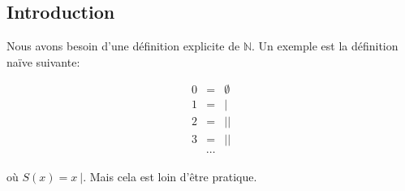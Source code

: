 \subsection{Introduction}

Nous avons besoin d'une définition explicite de $\mathbb{N}$.
Un exemple est la définition naïve suivante:

\begin{eqnarray*}
    0 &=& \emptyset \\
    1 &=& |\\
    2 &=& ||\\
    3 &=& ||\\
      &\cdots&
\end{eqnarray*}

où $S(x) = x \ |$. Mais cela est loin d'être pratique.
